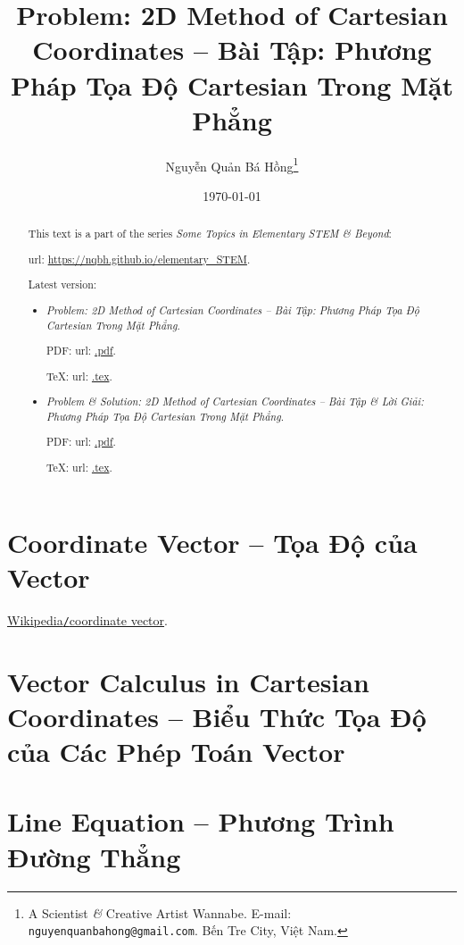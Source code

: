 \documentclass{article}
\title{Problem: 2D Method of Cartesian Coordinates -- Bài Tập: Phương Pháp Tọa Độ Cartesian Trong Mặt Phẳng}
\author{Nguyễn Quản Bá Hồng\footnote{A Scientist {\it\&} Creative Artist Wannabe. E-mail: {\tt nguyenquanbahong@gmail.com}. Bến Tre City, Việt Nam.}}
\date{\today}
\begin{document}
\maketitle
\begin{abstract}
	This text is a part of the series {\it Some Topics in Elementary STEM \& Beyond}:
	
	{\sc url}: \url{https://nqbh.github.io/elementary_STEM}.
	
	Latest version:
	\begin{itemize}
		\item {\it Problem: 2D Method of Cartesian Coordinates -- Bài Tập: Phương Pháp Tọa Độ Cartesian Trong Mặt Phẳng}.
		
		PDF: {\sc url}: \url{.pdf}.
		
		\TeX: {\sc url}: \url{.tex}.
		\item {\it Problem \& Solution: 2D Method of Cartesian Coordinates -- Bài Tập \& Lời Giải: Phương Pháp Tọa Độ Cartesian Trong Mặt Phẳng}.
		
		PDF: {\sc url}: \url{.pdf}.
		
		\TeX: {\sc url}: \url{.tex}.
	\end{itemize}
\end{abstract}
\tableofcontents


\section{Coordinate Vector -- Tọa Độ của Vector}
\href{https://en.wikipedia.org/wiki/Coordinate_vector}{Wikipedia{\tt/}coordinate vector}.


\section{Vector Calculus in Cartesian Coordinates -- Biểu Thức Tọa Độ của Các Phép Toán Vector}


\section{Line Equation -- Phương Trình Đường Thẳng}

\end{document}
